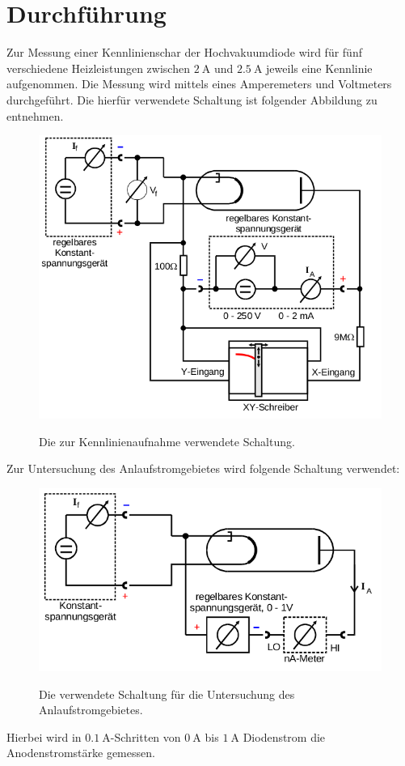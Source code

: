 \section{Durchführung}
\label{sec:Durchführung}
Zur Messung einer Kennlinienschar der Hochvakuumdiode wird für fünf
verschiedene Heizleistungen zwischen $\SI{2}{\ampere}$ und $\SI{2.5}{\ampere}$
jeweils eine Kennlinie aufgenommen. Die Messung wird mittels eines Amperemeters
und Voltmeters durchgeführt. Die hierfür verwendete Schaltung ist folgender
Abbildung zu entnehmen.
\begin{figure}[H]
  \centering
  \includegraphics[scale=0.5]{content/schaltungkennlinie.png}
  \label{fig:schaltungkennlinie}
  \caption{Die zur Kennlinienaufnahme verwendete Schaltung. \cite{AP01}}
\end{figure}
\noindent
Zur Untersuchung des Anlaufstromgebietes wird folgende Schaltung verwendet:
\begin{figure}[H]
  \centering
  \includegraphics[scale=0.5]{content/schaltunganlaufstromgebiet.png}
  \label{fig:schaltunganlaufstrom}
  \caption{Die verwendete Schaltung für die Untersuchung des Anlaufstromgebietes.\cite{AP01}}
\end{figure}
\noindent
Hierbei wird in $\SI{0.1}{\ampere}$-Schritten von $\SI{0}{\ampere}$ bis
$\SI{1}{\ampere}$ Diodenstrom die Anodenstromstärke gemessen.
